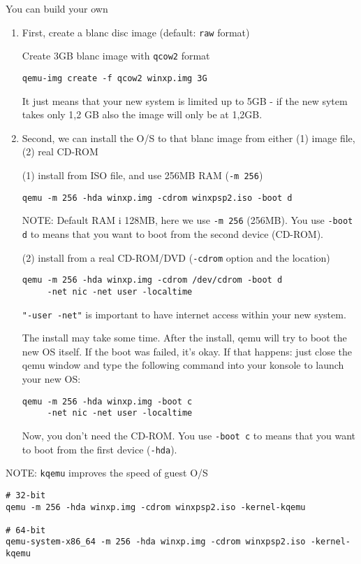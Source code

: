 You can build your own
\begin{enumerate}
  \item First, create a blanc disc image (default: \verb!raw! format)

Create 3GB blanc image with \verb!qcow2! format
\begin{verbatim}
qemu-img create -f qcow2 winxp.img 3G
\end{verbatim}  
It just means that your new system is limited up to 5GB - if the new sytem
takes only 1,2 GB also the image will only be at 1,2GB.

  
  \item Second, we can install the O/S to that blanc image from either (1)
  image file, (2) real CD-ROM

(1) install from ISO file, and use 256MB RAM (\verb!-m 256!)  
\begin{verbatim}
qemu -m 256 -hda winxp.img -cdrom winxpsp2.iso -boot d
\end{verbatim}
NOTE: Default RAM i 128MB, here we use \verb!-m 256! (256MB).
You use \verb!-boot d! to means that you want to boot from the second device
(CD-ROM).

(2) install from a real CD-ROM/DVD (\verb!-cdrom! option and the location)
\begin{verbatim}
qemu -m 256 -hda winxp.img -cdrom /dev/cdrom -boot d 
     -net nic -net user -localtime
\end{verbatim}
\verb!"-user -net"! is important to have internet access within your new system.


The install may take some time. After the install, qemu will try to boot the new
OS itself. If the boot was failed, it's okay. If
that happens: just close the qemu window and type the following command into
your konsole to launch your new OS:
\begin{verbatim}
qemu -m 256 -hda winxp.img -boot c 
     -net nic -net user -localtime
\end{verbatim}
Now, you don't need the CD-ROM.
You use \verb!-boot c! to means that you want to boot from the first device
(\verb!-hda!).


\end{enumerate}

NOTE: \verb!kqemu! improves the speed of guest O/S
\begin{verbatim}
# 32-bit
qemu -m 256 -hda winxp.img -cdrom winxpsp2.iso -kernel-kqemu

# 64-bit
qemu-system-x86_64 -m 256 -hda winxp.img -cdrom winxpsp2.iso -kernel-kqemu
\end{verbatim}


